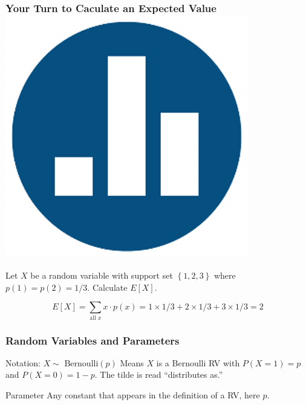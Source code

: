\documentclass[handout]{beamer}
\begin{document}
\begin{frame}
  \frametitle{Your Turn to Caculate an Expected Value \hfill\includegraphics[scale = 0.05]{./images/clicker}}
  Let $X$ be a random variable with support set $\left\{ 1,2,3 \right\}$ where $p(1)=p(2)=1/3$. Calculate $E[X]$.

  \pause

  \vspace{1em}
  \begin{equation*}
    E[X] = \sum_{\mbox{all }x} x \cdot p(x) = 1 \times 1/3 + 2 \times 1/3 + 3 \times 1/3 = 2
  \end{equation*}
\end{frame}

\begin{frame}
\frametitle{Random Variables and Parameters}



\begin{block}{Notation: $X \sim$ Bernoulli$(p)$}
Means $X$ is a Bernoulli RV with $P(X = 1) = p$ and $P(X= 0) = 1-p$. The tilde is read ``distributes as.''

\end{block}


\begin{block}{Parameter}
Any constant that appears in the definition of a RV, here $p$. 
\end{block}


\end{frame}
\end{document}
